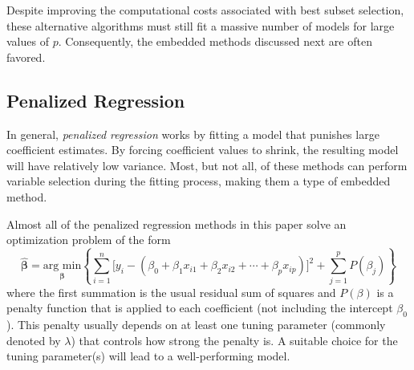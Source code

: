 \documentclass{article}
\newcommand{\argmin}[2]{\underset{#1}{\text{arg min}}\left\{#2\right\}}
\begin{document}
	Despite improving the computational costs associated with best subset selection, these alternative algorithms must still fit a massive number of models for large values of $p$. Consequently, the embedded methods discussed next are often favored. 
	
	\subsection{Penalized Regression}
	
	In general, \textit{penalized regression} works by fitting a model that punishes large coefficient estimates. By forcing coefficient values to shrink, the resulting model will have relatively low variance. Most, but not all, of these methods can perform variable selection during the fitting process, making them a type of embedded method.
	
	Almost all of the penalized regression methods in this paper solve an optimization problem of the form
	\begin{equation}\label{eqn:penalized-regression-lambda}
		\hat{\bm{\beta}}=\argmin{\bm{\beta}}{\sum\limits_{i = 1}^n \Big[y_i - (\beta_0 + \beta_1 x_{i1} + \beta_2 x_{i2} + \cdots + \beta_p x_{ip})\Big]^2 + \sum\limits_{j = 1}^p P(\beta_j)}
	\end{equation}
	where the first summation is the usual residual sum of squares and $P(\beta)$ is a penalty function that is applied to each coefficient (not including the intercept $\beta_0$). This penalty usually depends on at least one tuning parameter (commonly denoted by $\lambda$) that controls how strong the penalty is. A suitable choice for the tuning parameter(s) will lead to a well-performing model.

	
\end{document}
